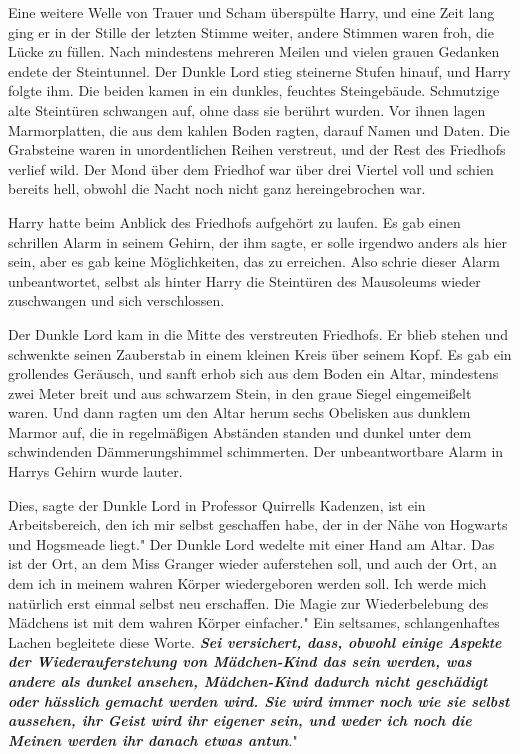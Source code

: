 Eine weitere Welle von Trauer und Scham überspülte Harry, und eine Zeit lang
ging er in der Stille der letzten Stimme weiter, andere Stimmen waren froh, die
Lücke zu füllen. Nach mindestens mehreren Meilen und vielen grauen Gedanken
endete der Steintunnel. Der Dunkle Lord stieg steinerne Stufen hinauf, und Harry
folgte ihm. Die beiden kamen in ein dunkles, feuchtes Steingebäude. Schmutzige
alte Steintüren schwangen auf, ohne dass sie berührt wurden. Vor ihnen lagen
Marmorplatten, die aus dem kahlen Boden ragten, darauf Namen und Daten. Die
Grabsteine waren in unordentlichen Reihen verstreut, und der Rest des Friedhofs
verlief wild. Der Mond über dem Friedhof war über drei Viertel voll und schien
bereits hell, obwohl die Nacht noch nicht ganz hereingebrochen war.

Harry hatte beim Anblick des Friedhofs aufgehört zu laufen. Es gab einen
schrillen Alarm in seinem Gehirn, der ihm sagte, er solle irgendwo anders als
hier sein, aber es gab keine Möglichkeiten, das zu erreichen. Also schrie dieser
Alarm unbeantwortet, selbst als hinter Harry die Steintüren des Mausoleums
wieder zuschwangen und sich verschlossen.

Der Dunkle Lord kam in die Mitte des verstreuten Friedhofs. Er blieb stehen und
schwenkte seinen Zauberstab in einem kleinen Kreis über seinem Kopf. Es gab ein
grollendes Geräusch, und sanft erhob sich aus dem Boden ein Altar, mindestens
zwei Meter breit und aus schwarzem Stein, in den graue Siegel eingemeißelt
waren. Und dann ragten um den Altar herum sechs Obelisken aus dunklem Marmor
auf, die in regelmäßigen Abständen standen und dunkel unter dem schwindenden
Dämmerungshimmel schimmerten. Der unbeantwortbare Alarm in Harrys Gehirn wurde
lauter.

\glqq Dies\grqq{}, sagte der Dunkle Lord in Professor Quirrells Kadenzen, \glqq
ist ein Arbeitsbereich, den ich mir selbst geschaffen habe, der in der Nähe von
Hogwarts und Hogsmeade liegt." Der Dunkle Lord wedelte mit einer Hand am Altar.
\glqq Das ist der Ort, an dem Miss Granger wieder auferstehen soll, und auch der
Ort, an dem ich in meinem wahren Körper wiedergeboren werden soll. Ich werde
mich natürlich erst einmal selbst neu erschaffen. Die Magie zur Wiederbelebung
des Mädchens ist mit dem wahren Körper einfacher." Ein seltsames,
schlangenhaftes Lachen begleitete diese Worte. \glqq \textbf{\emph{Sei
versichert, dass, obwohl einige Aspekte der Wiederauferstehung von Mädchen-Kind
das sein werden, was andere als dunkel ansehen, Mädchen-Kind dadurch nicht
geschädigt oder hässlich gemacht werden wird. Sie wird immer noch wie sie selbst
aussehen, ihr Geist wird ihr eigener sein, und weder ich noch die Meinen werden
ihr danach etwas antun}}."

